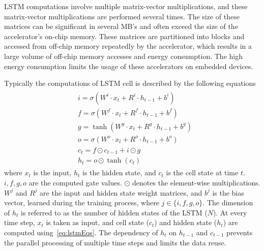 \documentclass[a4paper,10pt]{article}
\begin{document}
LSTM computations involve multiple matrix-vector multiplications, and these matrix-vector multiplications are performed several times. The size of these matrices can be significant in several MB's and often exceed the size of the accelerator's on-chip memory. These matrices are partitioned into blocks and accessed from off-chip memory repeatedly by the accelerator, which results in a large volume of off-chip memory accesses and energy consumption. The high energy consumption limits the usage of these accelerators on embedded devices.

Typically the computations of LSTM cell is described by the following equations
\begin{align}\label{eq:lstmEqs}
	\begin{split}
		&i{=}{\sigma}(W^i{\cdot}x_t{+}R^i{\cdot}h_{t-1}{+}b^i)\\
		&f{=}{\sigma}(W^f{\cdot}x_t{+}R^f{\cdot}h_{t-1}{+}b^f)\\
		&g{=}{\tanh}(W^g{\cdot}x_t{+}R^g{\cdot}h_{t-1}{+}b^g)\\
		&o{=}{\sigma}(W^o{\cdot}x_t{+}R^o{\cdot}h_{t-1}{+}b^o)\\
		&c_{t}{=}f{\odot}c_{t-1}{+}i{\odot}g\\
		&h_{t}{=}o{\odot}{\tanh}(c_t)
	\end{split}	
\end{align}
where $x_t$ is the input, $h_t$ is the hidden state, and $c_t$ is the cell state at time $t$. $i,f,g,o$ are the computed gate values. $\odot$ denotes the element-wise multiplications. $W^j$ and $R^j$ are the input and hidden state weight matrices, and $b^j$ is the bias vector, learned during the training process, where $j\in\{i,f,g,o\}$. The dimension of $h_t$ is referred to as the number of hidden states of the LSTM ($N$). 
At every time step, $x_t$ is taken as input, and cell state ($c_t$) and hidden state ($h_t$) are computed using~\eqref{eq:lstmEqs}. The dependency of $h_t$ on $h_{t-1}$ and $c_{t-1}$ prevents the parallel processing of multiple time steps and limits the data reuse. 
\end{document}

